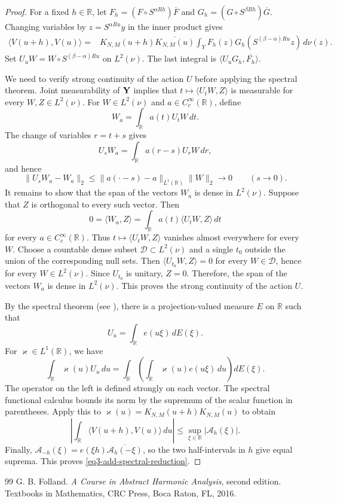 \documentclass[10pt,a4paper]{amsart}
\def \R {\mathbb R}
\def \Q {\mathbb Q}
\numberwithin{equation}{section}
\begin{document}
\begin{proof}
For a fixed $h\in\R$, let
$F_h=(F\circ S^{\alpha Rh})\overline F$ and
$G_h=(G\circ S^{\beta Rh})\overline G$.
Changing variables by $z=S^{\alpha Ru}y$ in the inner product gives
\begin{align*}
 \langle V(u+h),V(u)\rangle
 ={}&K_{N,M}(u+h)\overline{K_{N,M}(u)}
 \int_Y F_h(z)G_h(S^{(\beta-\alpha)Ru}z)\,d\nu(z).
\end{align*}
Set $U_uW=W\circ S^{(\beta-\alpha)Ru}$ on $L^2(\nu)$.
The last integral is $\langle U_uG_h,\overline{F_h}\rangle$.

We need to verify strong continuity of the action $U$ before applying the spectral theorem. Joint measurability of ${\bf Y}$ implies that
$t\mapsto\langle U_tW,Z\rangle$ is measurable for every $W,Z\in L^2(\nu)$. For
$W\in L^2(\nu)$ and $a\in C_c^\infty(\R)$, define 
\[
 W_a=\int_\R a(t)U_tW\,dt.
\]
The change of variables $r=t+s$ gives
\[
 U_sW_a=\int_\R a(r-s)U_rW\,dr,
\]
and hence
\[
 \|U_sW_a-W_a\|_2
 \le \|a(\cdot-s)-a\|_{L^{1}(\R)}\|W\|_2\longrightarrow0
 \qquad(s\to0).
\]
It remains to show that the span of the vectors $W_a$ is dense in $L^2(\nu)$. Suppose that
$Z$ is orthogonal to every such vector. Then
\[
 0=\langle W_a,Z\rangle
 =\int_\R a(t)\langle U_tW,Z\rangle\,dt
\]
for every $a\in C_c^\infty(\R)$. Thus
$t\mapsto\langle U_tW,Z\rangle$ vanishes almost everywhere for every $W$.
Choose a countable dense subset $\mathcal D\subset L^2(\nu)$ and a single
$t_0$ outside the union of the corresponding null sets. Then
$\langle U_{t_0}W,Z\rangle=0$ for every $W\in\mathcal D$, hence for every
$W\in L^2(\nu)$. Since $U_{t_0}$ is unitary, $Z=0$. Therefore, the span of the vectors $W_a$ is dense in $L^2(\nu)$. This proves the strong continuity of the action $U$.

By the spectral theorem (see \cite[Theorem~4.45]{Folland2016}), there is a
projection-valued measure $E$ on $\R$ such that
$$U_u=\int_\R e(u\xi)\,dE(\xi).$$ For $\varkappa\in L^1(\R)$, we have
\[
 \int_\R\varkappa(u)U_u\,du
 =\int_\R\left(\int_\R\varkappa(u)e(u\xi)\,du\right)dE(\xi).
\]
The operator on the left is defined strongly on each vector. The
spectral functional calculus bounds its norm by the supremum of the
scalar function in parentheses. Apply this to
$\varkappa(u)=K_{N,M}(u+h)\overline{K_{N,M}(u)}$ to obtain
\[
 \left|\int_\R\langle V(u+h),V(u)\rangle\,du\right|
 \le\sup_{\xi\in\R}|\mathcal A_h(\xi)|.
\]
Finally,
$\mathcal A_{-h}(\xi)=e(\xi h)\overline{\mathcal A_h(-\xi)}$,
so the two half-intervals in $h$ give equal suprema.
This proves \eqref{eq3-add-spectral-reduction}.
\end{proof}

\setcounter{section}{0}
\setcounter{equation}{0}
\setcounter{cl}{0}
\setcounter{fact}{0}
\setcounter{step}{0}
\setcounter{thm}{0}
\begin{thebibliography}{99}
 G. B. Folland. \newblock \emph{A Course in Abstract Harmonic Analysis}, second edition. \newblock Textbooks in Mathematics, CRC Press, Boca Raton, FL, 2016. 
\end{thebibliography}
\end{document}
